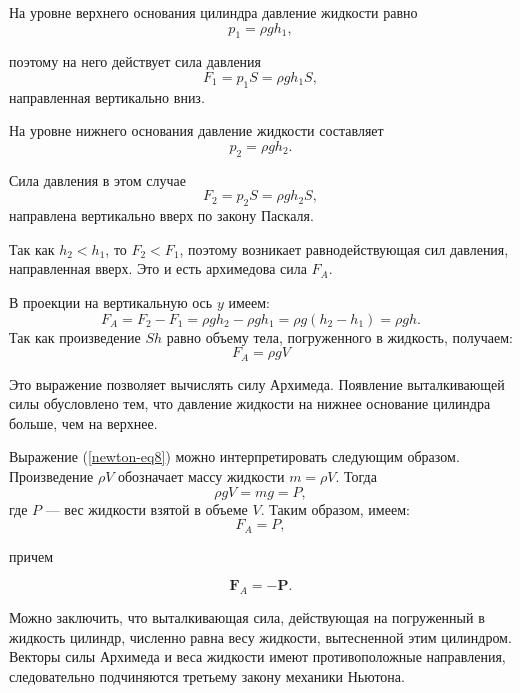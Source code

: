 \documentclass[14pt,a4paper,oneside]{extarticle}	%
\begin{document}
На уровне верхнего основания цилиндра давление жидкости равно $$ p_{1} = \rho gh_{1}, $$

поэтому на него действует сила давления $$ F_{1} = p_{1}S = \rho gh_{1}S, $$
направленная вертикально вниз.

На уровне нижнего основания давление жидкости составляет $$p_{2} = \rho gh_{2}.$$

Сила давления в этом случае $$ F_{2} = p_{2}S = \rho gh_{2}S, $$ 
направлена вертикально вверх по закону Паскаля.

Так как $ h_{2} < h_{1} $, то $ F_{2} < F_{1} $, поэтому возникает равнодействующая сил давления, направленная вверх. 
Это и есть архимедова сила $ F_{A} $. 

В проекции на вертикальную ось $ y $ имеем:
\begin{equation}\label{newton-eq7}
F_{A} = F_{2} - F_{1} = \rho gh_{2} - \rho gh_{1} = \rho g(h_{2} - h_{1}) = \rho gh.
\end{equation} 
Так как произведение $ Sh $ равно объему тела, погруженного в жидкость, получаем: 
\begin{equation}\label{newton-eq8}
F_{A} = \rho gV
\end{equation} 

Это выражение позволяет вычислять силу Архимеда.
Появление выталкивающей силы обусловлено тем, что давление жидкости на нижнее основание цилиндра больше, чем на верхнее.

Выражение (\ref{newton-eq8}) можно интерпретировать следующим образом. 
Произведение $ \rho V $ обозначает массу жидкости  $ m = \rho V $. 
Тогда $$\rho g V = mg = P,$$
где $ P $ — вес жидкости взятой в объеме $ V $. 
Таким образом, имеем:
\begin{equation}\label{newton-eq9}
F_{A} = P,
\end{equation} 

причем 

\begin{equation}\label{newton-eq10}
\textbf{F}_{A} = -\textbf{P}.
\end{equation} 

Можно заключить, что выталкивающая сила, действующая на погруженный в жидкость цилиндр, численно равна весу жидкости, вытесненной этим цилиндром.
Векторы силы Архимеда и веса жидкости имеют противоположные направления, следовательно подчиняются третьему закону механики Ньютона.
\end{document}
